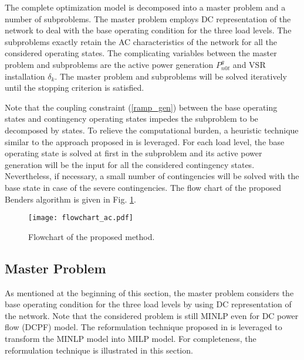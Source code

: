 \documentclass[journal]{IEEEtran}
\begin{document}
The complete optimization model is decomposed into a master problem and a number of subproblems. The master problem employs DC representation of the network to deal with the base operating condition for the three load levels. The subproblems exactly retain the AC characteristics of the network for all the considered operating states. The complicating variables between the master problem and subproblems are the active power generation $P^g_{n0t}$ and VSR installation $\delta_k$. The master problem and subproblems will be solved iteratively until the stopping criterion is satisfied. 

Note that the coupling constraint (\ref{ramp_gen}) between the base operating states and contingency operating states impedes the subproblem to be decomposed by states. To relieve the computational burden, a heuristic technique similar to the approach proposed in \cite{mybibb:KTH_UC_uncertainty} is leveraged. For each load level, the base operating state is solved at first in the subproblem and its active power generation will be the input for all the considered contingency states. Nevertheless, if necessary, a small number of contingencies will be solved with the base state in case of the severe contingencies. The flow chart of the proposed Benders algorithm is given in Fig. \ref{flowchart_ac}.
\begin{figure}[!htb]
	\centering
	\texttt{[image: flowchart\_ac.pdf]}
	\caption{Flowchart of the proposed method.}
	\label{flowchart_ac}
\end{figure}       

\subsection{Master Problem}
As mentioned at the beginning of this section, the master problem considers the base operating condition for the three load levels by using DC representation of the network. Note that the considered problem is still MINLP even for DC power flow (DCPF) model. The reformulation technique proposed in \cite{mybibb:tep_cvsr} is leveraged to transform the MINLP model into MILP model. For completeness, the reformulation technique is
illustrated in this section.
\end{document}
